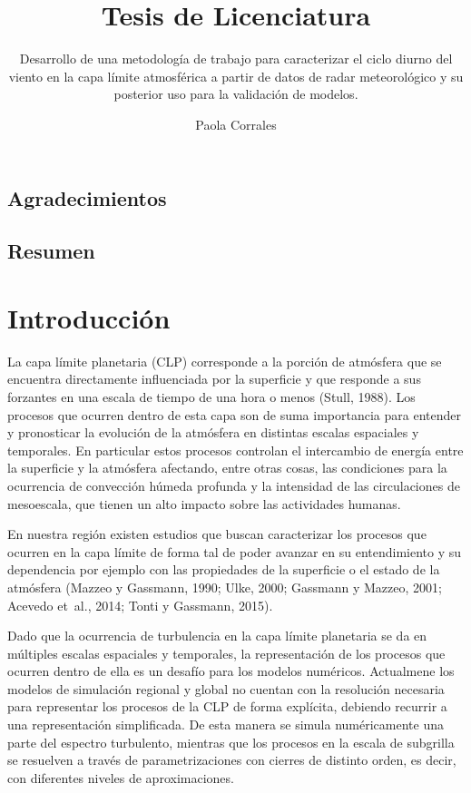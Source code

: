 \documentclass[12pt,spanish,oneside]{book}
\title{Tesis de Licenciatura}
\subtitle{Desarrollo de una metodología de trabajo para caracterizar el ciclo
diurno del viento en la capa límite atmosférica a partir de datos de
radar meteorológico y su posterior uso para la validación de modelos.}
\author{Paola Corrales}
\date{}
\begin{document}
\maketitle

{
\setcounter{tocdepth}{3}
\tableofcontents
}
\renewcommand{\listtablename}{Índice de tablas} 
\renewcommand{\tablename}{Tabla} 

\listoffigures
\newpage

\listoftables
\newpage

\section*{Agradecimientos}\newpage

\section*{Resumen}\newpage

\chapter{Introducción}\label{introduccion}

La capa límite planetaria (CLP) corresponde a la porción de atmósfera
que se encuentra directamente influenciada por la superficie y que
responde a sus forzantes en una escala de tiempo de una hora o menos
(Stull, 1988). Los procesos que ocurren dentro de esta capa son de suma
importancia para entender y pronosticar la evolución de la atmósfera en
distintas escalas espaciales y temporales. En particular estos procesos
controlan el intercambio de energía entre la superficie y la atmósfera
afectando, entre otras cosas, las condiciones para la ocurrencia de
convección húmeda profunda y la intensidad de las circulaciones de
mesoescala, que tienen un alto impacto sobre las actividades humanas.

En nuestra región existen estudios que buscan caracterizar los procesos
que ocurren en la capa límite de forma tal de poder avanzar en su
entendimiento y su dependencia por ejemplo con las propiedades de la
superficie o el estado de la atmósfera (Mazzeo y Gassmann, 1990; Ulke,
2000; Gassmann y Mazzeo, 2001; Acevedo et~al., 2014; Tonti y Gassmann,
2015).

Dado que la ocurrencia de turbulencia en la capa límite planetaria se da
en múltiples escalas espaciales y temporales, la representación de los
procesos que ocurren dentro de ella es un desafío para los modelos
numéricos. Actualmene los modelos de simulación regional y global no
cuentan con la resolución necesaria para representar los procesos de la
CLP de forma explícita, debiendo recurrir a una representación
simplificada. De esta manera se simula numéricamente una parte del
espectro turbulento, mientras que los procesos en la escala de subgrilla
se resuelven a través de parametrizaciones con cierres de distinto
orden, es decir, con diferentes niveles de aproximaciones.
\end{document}
